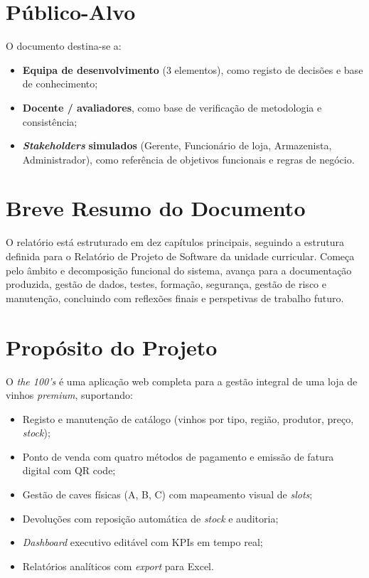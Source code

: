 \documentclass[11pt,a4paper]{report}
\begin{document}
\section{Público-Alvo}
O documento destina-se a:
\begin{itemize}
  \item \textbf{Equipa de desenvolvimento} (3 elementos), como registo de decisões e base de conhecimento;
  \item \textbf{Docente / avaliadores}, como base de verificação de metodologia e consistência;
  \item \textit{\textbf{Stakeholders}} \textbf{simulados} (Gerente, Funcionário de loja, Armazenista, Administrador), como referência de objetivos funcionais e regras de negócio.
\end{itemize}

\section{Breve Resumo do Documento}
O relatório está estruturado em dez capítulos principais, seguindo a estrutura definida para o Relatório de Projeto de Software da unidade curricular. Começa pelo âmbito e decomposição funcional do sistema, avança para a documentação produzida, gestão de dados, testes, formação, segurança, gestão de risco e manutenção, concluindo com reflexões finais e perspetivas de trabalho futuro.

\section{Propósito do Projeto}
O \textit{the 100's} é uma aplicação web completa para a gestão integral de uma loja de vinhos \textit{premium}, suportando:

\begin{itemize}
  \item Registo e manutenção de catálogo (vinhos por tipo, região, produtor, preço, \textit{stock});
  \item Ponto de venda com quatro métodos de pagamento e emissão de fatura digital com QR code;
  \item Gestão de caves físicas (A, B, C) com mapeamento visual de \textit{slots};
  \item Devoluções com reposição automática de \textit{stock} e auditoria;
  \item \textit{Dashboard} executivo editável com KPIs em tempo real;
  \item Relatórios analíticos com \textit{export} para Excel.
\end{itemize}
\end{document}
